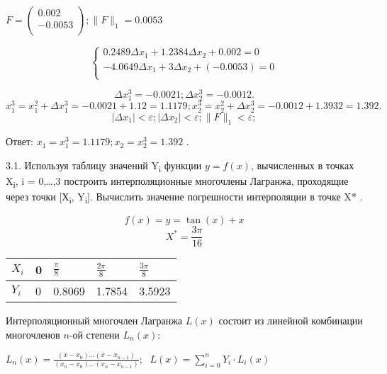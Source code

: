 \documentclass[10pt, a4paper]{scrartcl}
\begin{document}
\(\displaystyle F = \begin{pmatrix} 0.002\\ -0.0053\\ \end{pmatrix}; \parallel F \parallel _1 = 0.0053\)

\[\begin{cases}
0.2489\Delta x_1 + 1.2384\Delta x_2 + 0.002 = 0\\
-4.0649\Delta x_1 + 3\Delta x_2 + (-0.0053) = 0\\
\end{cases}\]

\[\Delta x_1^3 = -0.0021; \Delta x_2^3 = -0.0012.\]
\[x_1^3 = x_1^2 + \Delta x_1^3 = -0.0021 + 1.12 = 1.1179;  x_2^3 = x_2^2 + \Delta x_2^3 = -0.0012 + 1.3932 = 1.392.\]
\[|\Delta x_1|  <  \varepsilon ;|\Delta x_2|  <  \varepsilon ;\parallel F \parallel _1  <  \varepsilon ;\]

Ответ: \(x_1 = x_1^3 = 1.1179; x_2 = x_2^3 = 1.392\) .

\pagebreak

3.1. Используя таблицу значений Y\textsubscript{i} функции \(y = f(x)\),
вычисленных в точках X\textsubscript{i}, i = 0,\ldots{},3 построить
интерполяционные многочлены Лагранжа, проходящие через точки
{[}Х\textsubscript{i}, Y\textsubscript{i}{]}. Вычислить значение
погрешности интерполяции в точке X* .

\[f(x) = y = \tan(x) + x\] \[X^{*} = \frac{3\pi}{16}\] \vspace{5mm}
\renewcommand{\arraystretch}{3}

\begin{center}
\begin{tabular}{ | l  | l  | l  | l  | l |}
\hline
$X_i$ & 0 & $\displaystyle\frac{\pi}{8}$ & $\displaystyle\frac{2\pi}{8}$ & $\displaystyle\frac{3\pi}{8}$ \\ \hline
$Y_i$ & 0 & 0.8069 & 1.7854 & 3.5923 \\ \hline
\end{tabular}
\end{center}\renewcommand{\arraystretch}{1}\vspace{5mm}

Интерполяционный многочлен Лагранжа \(L(x)\) состоит из линейной
комбинации многочленов \(n\)-ой степени \(L_n(x)\):

\(\displaystyle L_n(x) = \frac{(x - x_0)\dots (x - x_{n-1})}{(x_n - x_0)\dots (x_n - x_{n-1})} ; \;\)
\(\displaystyle L(x) = \sum_{i=0}^{n} Y_i \cdot L_i(x)\)
\end{document}
